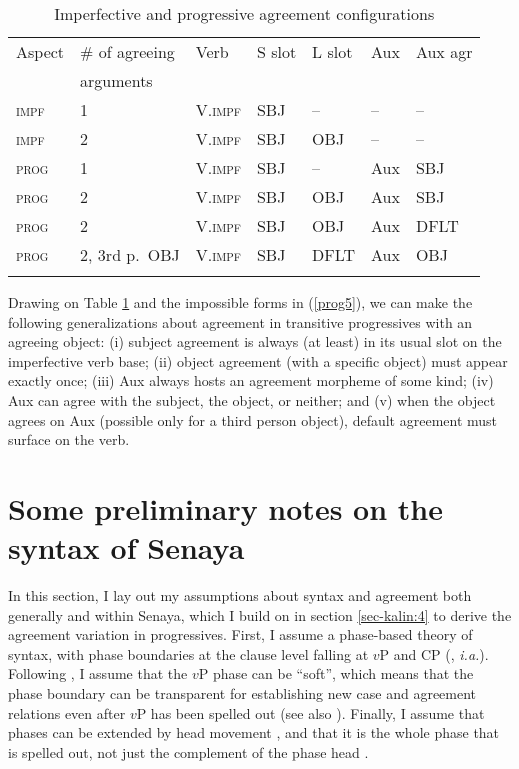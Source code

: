 \documentclass[output=paper
,modfonts
,nonflat]{langsci/langscibook}
\begin{document}
\begin{table}
\caption{Imperfective and progressive agreement configurations}
\label{tab-kalin:2}
\begin{tabularx}{\textwidth}{XlXXXXX}
\lsptoprule Aspect & \# of agreeing & Verb & S slot & L slot & Aux & Aux agr  \\
& arguments & & & & & \\
\midrule
  \textsc{impf} & 1 & V.\textsc{impf} & SBJ & -- & -- & -- \\
  \textsc{impf} & 2 & V.\textsc{impf}& SBJ & OBJ & -- & -- \\
  \textsc{prog} & 1 & V.\textsc{impf}& SBJ & -- & Aux & SBJ \\
 \textsc{prog}  & 2  & V.\textsc{impf}& SBJ & OBJ & Aux & SBJ\\
  \textsc{prog} & 2 & V.\textsc{impf}& SBJ & OBJ & Aux & DFLT \\
  \textsc{prog} & 2, 3rd p.\ OBJ & V.\textsc{impf}& SBJ & DFLT & Aux& OBJ \\
  	\lspbottomrule
 \end{tabularx}
\end{table}

\noindent Drawing on Table \ref{tab-kalin:2} and the impossible forms in (\ref{prog5}), we can make the following generalizations about agreement in transitive progressives with an agreeing object: (i) subject agreement is always (at least) in its usual slot on the imperfective verb base; (ii) object agreement (with a specific object) must appear exactly once; (iii) Aux always hosts an agreement morpheme of some kind; (iv) Aux can agree with the subject, the object, or neither; and (v) when the object agrees on Aux (possible only for a third person object), default agreement must surface on the verb.

\section{Some preliminary notes on the syntax of Senaya} \label{sec-kalin:3}

In this section, I lay out my assumptions about syntax and agreement both generally and within Senaya, which I build on in section \ref{sec-kalin:4} to derive the agreement variation in progressives. First, I assume a phase-based theory of syntax, with phase boundaries at the clause level falling at $v$P and CP (\citealt{Chomsky01}, \textit{i.a.}). Following \citet{Baker15}, I assume that the $v$P phase can be ``soft'', which means that the phase boundary can be transparent for establishing new case and agreement relations even after $v$P has been spelled out (see also ). Finally, I assume that phases can be extended by head movement \citep{denDikken06,denDikken07,Gallego10}, and that it is the whole phase that is spelled out, not just the complement of the phase head \citep{FP05}.
\end{document}
